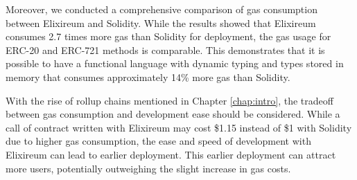 Moreover, we conducted a comprehensive comparison of gas consumption between Elixireum and Solidity. While the results showed that Elixireum consumes 2.7 times more gas than Solidity for deployment, the gas usage for ERC-20 and ERC-721 methods is comparable. This demonstrates that it is possible to have a functional language with dynamic typing and types stored in memory that consumes approximately 14\% more gas than Solidity.

With the rise of rollup chains mentioned in Chapter \ref{chap:intro}, the tradeoff between gas consumption and development ease should be considered. While a call of contract written with Elixireum may cost \$1.15 instead of \$1 with Solidity due to higher gas consumption, the ease and speed of development with Elixireum can lead to earlier deployment. This earlier deployment can attract more users, potentially outweighing the slight increase in gas costs.